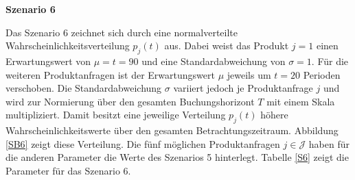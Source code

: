 \textbf{Szenario 6}

Das Szenario 6 zeichnet sich durch eine normalverteilte Wahrscheinlichkeitsverteilung $p_j(t)$ aus. Dabei weist das Produkt $j=1$ einen Erwartungswert von $\mu=t=90$ und eine Standardabweichung von $\sigma=1$. Für die weiteren Produktanfragen ist der Erwartungswert $\mu$ jeweils um $t=20$ Perioden verschoben. Die Standardabweichung $\sigma$ variiert jedoch je Produktanfrage $j$ und wird zur Normierung über den gesamten Buchungshorizont $T$ mit einem Skala multipliziert. Damit besitzt eine jeweilige Verteilung $p_j(t)$ höhere Wahrscheinlichkeitswerte über den gesamten Betrachtungszeitraum. Abbildung \ref{SB6} zeigt diese Verteilung. Die fünf möglichen Produktanfragen $j\in\mathcal{J}$ haben für die anderen Parameter die Werte des Szenarios 5 hinterlegt. Tabelle \ref{S6} zeigt die Parameter für das Szenario 6.

